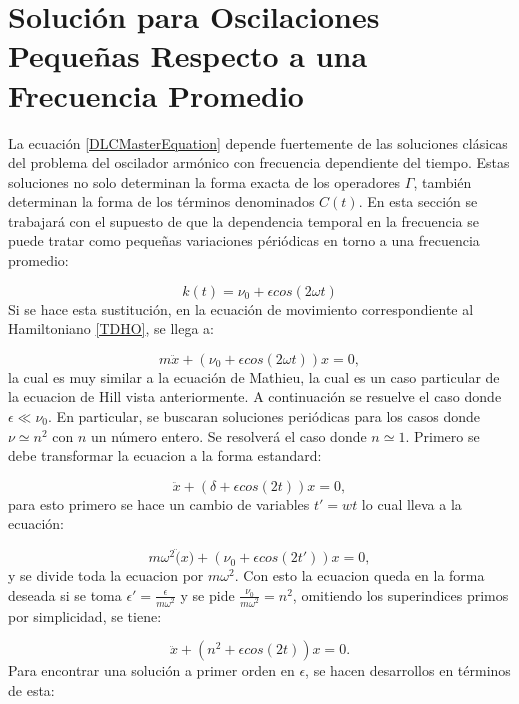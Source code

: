 \documentclass[a4paper,10pt]{report}
\begin{document}
\section{Solución para Oscilaciones Pequeñas Respecto a una Frecuencia Promedio}

La ecuación \ref{DLCMasterEquation} depende fuertemente de las soluciones clásicas del problema del oscilador armónico con frecuencia dependiente del tiempo. Estas soluciones no solo determinan la forma exacta de los operadores $\Gamma$, también determinan la forma de los términos denominados $C(t)$. En esta sección se trabajará con el supuesto de que la dependencia temporal en la frecuencia se puede tratar como pequeñas variaciones périódicas en torno a una frecuencia promedio:

\begin{equation}
k(t) = \nu_0 + \epsilon cos(2\omega t)
\end{equation}Si se hace esta sustitución, en la ecuación de movimiento correspondiente al Hamiltoniano \ref{TDHO}, se llega a:

\begin{equation}
m\ddot{x} + (\nu_0 + \epsilon cos(2\omega t))x = 0,
\end{equation} la cual es muy similar a la ecuación de Mathieu, la cual es un caso particular de la ecuacion de Hill vista anteriormente. A continuación se resuelve el caso donde $\epsilon \ll \nu_0$. En particular, se buscaran soluciones periódicas para los casos donde $\nu \simeq n^2$ con $n$ un número entero. Se resolverá el caso donde $n \simeq 1$. Primero se debe transformar la ecuacion a la forma estandard:

\begin{equation}
\ddot{x} + (\delta+\epsilon cos(2t))x=0,
\end{equation} para esto primero se hace un cambio de variables $t' = wt$ lo cual lleva a la ecuación:

\begin{equation}
m\omega^2\ddot(x)+(\nu_0+\epsilon cos(2t'))x=0,
\end{equation} y se divide toda la ecuacion por $m\omega^2$. Con esto la ecuacion queda en la forma deseada si se toma $\epsilon' = \frac{\epsilon}{m\omega^2}$ y se pide $\frac{\nu_0}{m\omega^2} = n^2$, omitiendo los superindices primos por simplicidad, se tiene:

\begin{equation} \label{MathieuEquation}
\ddot{x} + (n^2+\epsilon cos(2t))x=0.
\end{equation} Para encontrar una solución a primer orden en $\epsilon$, se hacen desarrollos en términos de esta:
\end{document}
